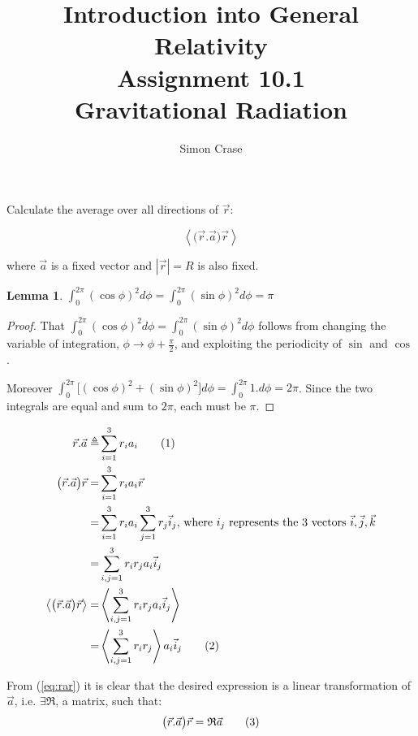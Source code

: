 \documentclass[]{article}
\title{Introduction into General Relativity\\Assignment 10.1\\Gravitational Radiation}
\author{Simon Crase}
\newcommand\numberthis{\addtocounter{equation}{1}\tag{\theequation}}
\newtheorem{lemma}{Lemma}
\begin{document}
\maketitle

Calculate the average over all directions of $\vec{r}$:

$$\left\langle \big(\vec{r}.\vec{a}\big)\vec{r} \right\rangle$$

where $\vec{a}$ is a fixed vector and $|\vec{r}|=R$ is also fixed.

\begin{lemma}\label{lemma:i1}
	$\int_{0}^{2\pi}(\cos\phi)^2  d\phi = \int_{0}^{2\pi}(\sin\phi)^2  d\phi=\pi$
\end{lemma}
\begin{proof}
	That $\int_{0}^{2\pi}(\cos\phi)^2  d\phi = \int_{0}^{2\pi}(\sin\phi)^2  d\phi$ follows from changing the variable of integration, $\phi\rightarrow\phi+\frac{\pi}{2}$, and exploiting the periodicity of $\sin$ and $\cos$. 
	
	Moreover $\int_{0}^{2\pi}\big[(\cos\phi)^2  +(\sin\phi)^2\big] d\phi=\int_{0}^{2\pi}1. d\phi=2\pi$. Since the two integrals are equal and sum to $2\pi$, each must be $\pi$.
\end{proof}
\begin{align*}
\vec{r}.\vec{a} \triangleq& \sum_{i=1}^{3}r_ia_i\numberthis\label{eq:ra}\\
\big(\vec{r}.\vec{a}\big)\vec{r} =& \sum_{i=1}^{3}r_ia_i \vec{r}\\
=& \sum_{i=1}^{3}r_ia_i \sum_{j=1}^{3}r_j\vec{i}_j \text{, where $i_j$ represents the 3 vectors $\vec{i},\vec{j},\vec{k}$}\\
=& \sum_{i,j=1}^{3}r_i  r_j a_i \vec{i}_j \\
\left\langle \big(\vec{r}.\vec{a}\big)\vec{r} \right\rangle=&\left\langle \sum_{i,j=1}^{3}r_i  r_j a_i \vec{i}_j\right\rangle\\
=&\left\langle \sum_{i,j=1}^{3}r_i  r_j\right\rangle a_i \vec{i}_j
\numberthis\label{eq:rar}
\end{align*}

From (\ref{eq:rar}) it is clear that the desired expression is a linear transformation of $\vec{a}$, i.e. $\exists \mathfrak{R}$, a matrix, such that:
\begin{align*}
\big(\vec{r}.\vec{a}\big)\vec{r} =\mathfrak{R}\vec{a} \numberthis \label{eq:linear}
\end{align*} 
\end{document}
